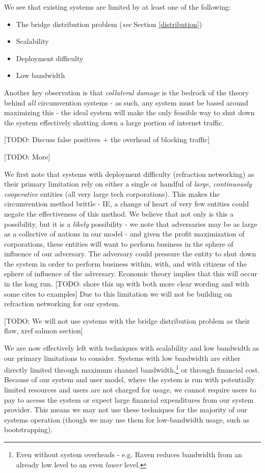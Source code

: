 \documentclass[12pt]{report}
\begin{document}
We see that existing systems are limited by at least one of the following:
\begin{itemize}
  \item The bridge distribution problem (\emph{see} Section \ref{distribution})
  \item Scalability
  \item Deployment difficulty
  \item Low bandwidth
\end{itemize}

Another key observation is that \emph{collateral damage} is the bedrock of the theory behind \emph{all} circumvention systems - as such, any system must be based around maximizing this - the ideal system will make the only feasible way to shut down the system effectively shutting down a large portion of internet traffic. 

[TODO: Discuss false positives + the overhead of blocking traffic]

[TODO: More]

We first note that systems with deployment difficulty (refraction networking) as their primary limitation rely on either a single or handful of \emph{large}, \emph{continuously cooperative} entities (all very large tech corporations). This makes the circumvention method brittle - IE, a change of heart of very few entities could negate the effectiveness of this method. We believe that not only is this a possibility, but it is a \emph{likely} possibility - we note that adversaries may be as large as a collective of nations in our model - and given the profit maximization of corporations, these entities will want to perform business in the sphere of influence of our adversary. The adversary could pressure the entity to shut down the system in order to perform business within, with, and with citizens of the sphere of influence of the adversary. Economic theory implies that this will occur in the long run. [TODO: shore this up with both more clear wording and with some cites to examples] Due to this limitation we will not be building on refraction networking for our system.

[TODO: We will not use systems with the bridge distribution problem as their flaw, xref salmon section]

We are now effectively left with techniques with scalability and low bandwidth as our primary limitations to consider. Systems with low bandwidth are either directly limited through maximum channel bandwidth,\footnote{Even without system overheads - e.g. Raven reduces bandwidth from an already low level to an even \emph{lower} level.} or through financial cost. Because of our system and user model, where the system is run with potentially limited resources and users are not charged for usage, we cannot require users to pay to access the system or expect large financial expenditures from our system provider. This means we may not use these techniques for the majority of our systems operation (though we may use them for low-bandwidth usage, such as bootstrapping).
\end{document}
